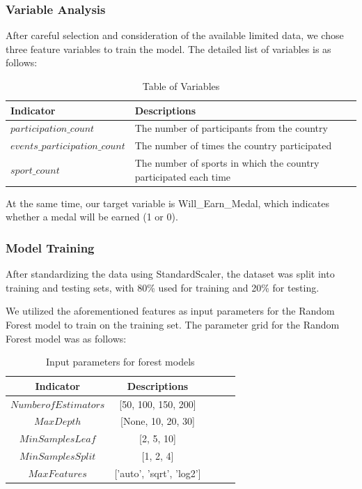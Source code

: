 \documentclass{mcmthesis}
\begin{document}
\subsubsection{Variable Analysis}
After careful selection and consideration of the available limited data, we chose three feature variables to train the model. The detailed list of variables is as follows:

    \begin{table}[h] 
        \centering  
        \caption{Table of Variables}  
        \label{tab1} 
    \begin{tabular}{ll} 
        \toprule
        Indicator  & Descriptions \\    
        \midrule 
        $participation\_count$ & The number of participants from the country\\
        $events\_participation\_count$ & The number of times the country participated\\
        $sport\_count$   & The number of sports in which the country participated each time \\
        \bottomrule
    \end{tabular}
    \end{table}

    At the same time, our target variable is Will\_Earn\_Medal, which indicates whether a medal will be earned (1 or 0).

\subsubsection{Model Training}
   
    After standardizing the data using StandardScaler, the dataset was split into training and testing sets, with 80\% used for training and 20\% for testing.

    We utilized the aforementioned features as input parameters for the Random Forest model to train on the training set. The parameter grid for the Random Forest model was as follows:
    \begin{table}[h] 
        \centering  
        \caption{Input parameters for forest models}  
        \label{tab1} 
    \begin{tabular}{ccccc} 
        \toprule
        Indicator  & Descriptions \\    
        \midrule 
        $Number of Estimators$ & [50, 100, 150, 200]\\
        $Max Depth$ & [None, 10, 20, 30]\\
        $Min Samples Leaf$   & [2, 5, 10] \\
        $Min Samples Split$ & [1, 2, 4]\\
        $Max Features$ & ['auto', 'sqrt', 'log2']\\
        \bottomrule
    \end{tabular}
    \end{table}
\end{document}
